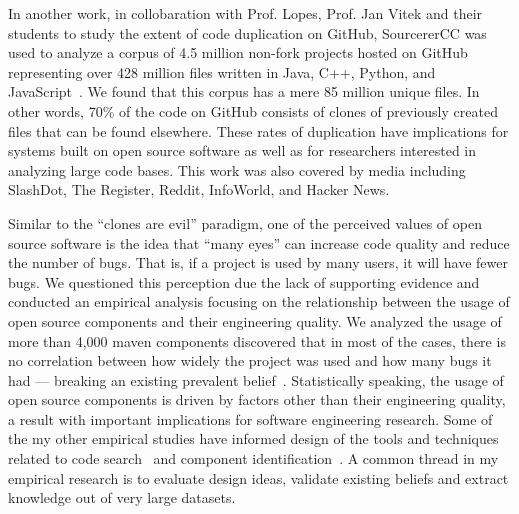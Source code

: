 \documentclass[a4paper]{article}
\begin{document}
In another work, in collobaration with Prof. Lopes, Prof. Jan Vitek and their students 
to study the extent of code duplication on GitHub, SourcererCC was used to 
analyze a corpus of 4.5 million non-fork projects hosted on GitHub representing over 428 million files written
in Java, C++, Python, and JavaScript~\cite{dejavu}. We found that this corpus has a mere 85 million unique files. In other
words, 70\% of the code on GitHub consists of clones of previously created files that can be found elsewhere. These rates
of duplication have implications for systems built on open source software as well as for researchers interested
in analyzing large code bases. This work was also covered by media including SlashDot, The Register, Reddit, InfoWorld,
and Hacker News.

Similar to the \enquote{clones are evil} paradigm, one of the perceived values of open source software is the idea that \enquote{many eyes} can increase code quality and reduce the number
of bugs. That is, if a project is used by many users, it will have fewer bugs. We
questioned this perception due the lack of supporting evidence and conducted an
empirical analysis focusing on the relationship between the usage of open source
components and their engineering quality. We analyzed the usage of more than 4,000 maven components discovered that
in most of the cases, there is no correlation between how widely the project was used
and how many bugs it had --- breaking an existing prevalent belief~\cite{quality-popularity}. Statistically speaking,
the usage of open source components is driven by factors other than their engineering
quality, a result with important implications for software engineering research. 
Some of the my other empirical studies have informed design of the tools and techniques related to code search~\cite{codesearch, interfaceredundancy} and component identification~\cite{astra}. 
A common thread in my empirical research is to evaluate design ideas, validate existing beliefs and extract knowledge out of very large datasets.
\end{document}
